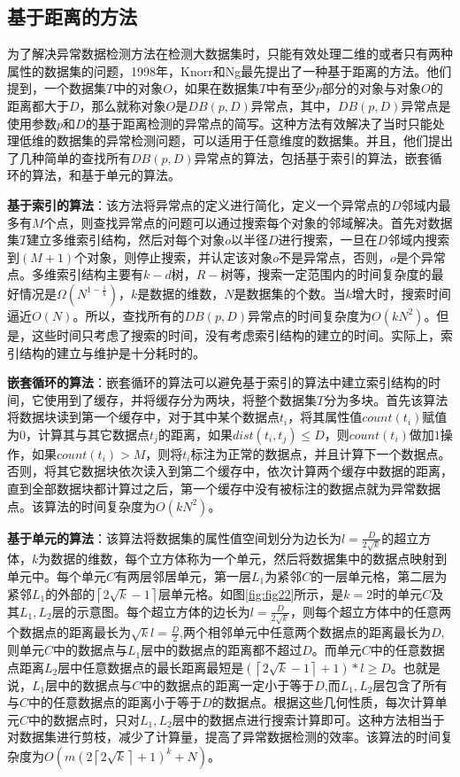 \subsection{基于距离的方法}
为了解决异常数据检测方法在检测大数据集时，只能有效处理二维的或者只有两种属性的数据集的问题，1998年，Knorr和Ng最先提出了一种基于距离的方法。他们提到，一个数据集$T$中的对象$O$，如果在数据集$T$中有至少$p$部分的对象与对象$O$的距离都大于$D$，那么就称对象$O$是$DB\left(p,D \right)$异常点，其中，$DB\left(p,D \right)$异常点是使用参数$p$和$D$的基于距离检测的异常点的简写。这种方法有效解决了当时只能处理低维的数据集的异常检测问题，可以适用于任意维度的数据集。并且，他们提出了几种简单的查找所有$DB\left(p,D \right)$异常点的算法，包括基于索引的算法，嵌套循环的算法，和基于单元的算法。

\textbf{基于索引的算法}：该方法将异常点的定义进行简化，定义一个异常点的$D$邻域内最多有$M$个点，则查找异常点的问题可以通过搜索每个对象的邻域解决。首先对数据集$T$建立多维索引结构，然后对每个对象$o$以半径$D$进行搜索，一旦在$D$邻域内搜索到$(M+1)$个对象，则停止搜索，并认定该对象$o$不是异常点，否则，$o$是个异常点。多维索引结构主要有$k-d$树，$R-$树等，搜索一定范围内的时间复杂度的最好情况是$\Omega (N^{1-\frac{1}{k}})$，$k$是数据的维数，$N$是数据集的个数。当$k$增大时，搜索时间逼近$O(N)$。所以，查找所有的$DB(p,D)$异常点的时间复杂度为$O(kN^2)$。但是，这些时间只考虑了搜索的时间，没有考虑索引结构的建立的时间。实际上，索引结构的建立与维护是十分耗时的。

\textbf{嵌套循环的算法}：嵌套循环的算法可以避免基于索引的算法中建立索引结构的时间，它使用到了缓存，并将缓存分为两块，将整个数据集$T$分为多块。首先该算法将数据块读到第一个缓存中，对于其中某个数据点$t_i$，将其属性值$count(t_i)$赋值为0，计算其与其它数据点$t_j$的距离，如果$dist(t_i, t_j) \leq D$，则$count(t_i)$做加$1$操作，如果$count(t_i) > M$，则将$t_i$标注为正常的数据点，并且计算下一个数据点。否则，将其它数据块依次读入到第二个缓存中，依次计算两个缓存中数据的距离，直到全部数据块都计算过之后，第一个缓存中没有被标注的数据点就为异常数据点。该算法的时间复杂度为$O(kN^2)$。

\textbf{基于单元的算法}：该算法将数据集的属性值空间划分为边长为$l=\frac{D}{2\sqrt{k}}$的超立方体，$k$为数据的维数，每个立方体称为一个单元，然后将数据集中的数据点映射到单元中。每个单元$C$有两层邻居单元，第一层$L_1$为紧邻$C$的一层单元格，第二层为紧邻$L_1$的外部的$\left \lceil 2\sqrt{k} -1 \right \rceil$层单元格。如图\ref{fig:fig22}所示，是$k=2$时的单元$C$及其$L_1,L_2$层的示意图。每个超立方体的边长为$l=\frac{D}{2\sqrt{k}}$，则每个超立方体中的任意两个数据点的距离最长为$\sqrt{k}l = \frac{D}{2}$,两个相邻单元中任意两个数据点的距离最长为$D$,则单元$C$中的数据点与$L_1$层中的数据点的距离都不超过$D$。而单元$C$中的任意数据点距离$L_2$层中任意数据点的最长距离最短是$(\left \lceil 2\sqrt{k} -1 \right \rceil + 1) * l \geq D$。也就是说，$L_1$层中的数据点与$C$中的数据点的距离一定小于等于$D$,而$L_1,L_2$层包含了所有与$C$中的任意数据点的距离小于等于$D$的数据点。根据这些几何性质，每次计算单元$C$中的数据点时，只对$L_1,L_2$层中的数据点进行搜索计算即可。这种方法相当于对数据集进行剪枝，减少了计算量，提高了异常数据检测的效率。该算法的时间复杂度为$O(m(2\left \lceil 2\sqrt{k} \right \rceil +1)^k + N)$。

